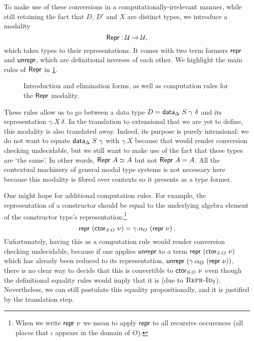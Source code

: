 To make use of these conversions in a computationally-irrelevant manner,
while still retaining the fact that $D$, $D'$ and $X$ are distinct types,
we introduce a modality
$$
\textsf{Repr} : \mathcal{U} \to \mathcal{U} ,
$$
which takes types to their representations. It comes with two term formers
$\textsf{repr}$ and $\textsf{unrepr}$, which are definitional inverses of each other. We
highlight the main rules of $\textsf{Repr}$ in \cref{fig:repr-rules}.

\begin{figure}[H]
\caption{Introduction and elimination forms, as well as computation rules
for the $\textsf{Repr}$ modality.}
\label{fig:repr-rules}
\end{figure}

These rules allow us to go between a data type $D = \textsf{data}_\Delta\ S\ \gamma\
\delta$ and its representation $\gamma.X\ \delta$. In the translation to
extensional \lambdamltt that we are yet to define, this modality is also
translated away. Indeed, its purpose is purely intensional: we do not want to
equate $\textsf{data}_\Delta\ S\ \gamma$ with $\gamma.X$ because that would render
conversion checking undecidable, but we still want to make use of the fact that
these types are `the same'. In other words, $\textsf{Repr}\ A \simeq A$ but not
$\textsf{Repr}\ A = A$. All the contextual machinery of general modal type systems
\cite{Gratzer2020-kf} is not necessary here because this modality is fibred over
contexts so it presents as a type former.

One might hope for additional computation rules. For example, the representation
of a constructor should be equal to the underlying algebra element of the
constructor type's representation:\footnote{When we write $\Mrepr\ \nu$ we mean
to apply $\textsf{repr}$ to all recursive occurences (all places that $\iota$ appears
in the domain of $O$).} \[\textsf{repr}\ (\textsf{ctor}_{S.O}\ \nu) = \gamma.\alpha_O\ (\textsf{repr}
\ \nu) \,.\] Unfortunately, having this as a computation rule would render
conversion checking undecidable, because if one applies $\textsf{unrepr}$ to a term
$\textsf{repr}\ (\textsf{ctor}_{S.O}\ \nu)$ which has already been reduced to its
representation, $\mta{unrepr}\ (\gamma.\alpha_O\ (\Mrepr\ \nu))$, there is no
clear way to decide that this is convertible to $\textsf{ctor}_{S.O}\ \nu$ even though
the definitional equality rules would imply that it is (due to
$\textsc{Repr-Id}_2$). Nevertheless, we can still postulate this equality
propositionally, and it is justified by the translation step.

